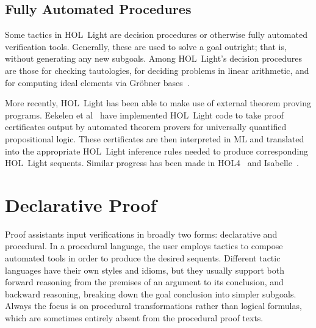 \subsection{Fully Automated Procedures}
Some tactics in HOL~Light are decision procedures or otherwise fully automated verification tools. Generally, these are used to solve a goal outright; that is, without generating any new subgoals. Among HOL~Light's decision procedures are those for checking tautologies, for deciding problems in linear arithmetic, and for computing ideal elements via Gr\"{o}bner bases~\cite{BuchbergerGrobner}.

More recently, HOL~Light has been able to make use of external theorem proving programs. Eekelen et al~\cite{HOLLightBoolean} have implemented HOL~Light code to take proof certificates output by automated theorem provers for universally quantified propositional logic. These certificates are then interpreted in ML and translated into the appropriate HOL~Light inference rules needed to produce corresponding HOL~Light sequents. Similar progress has been made in HOL4~\cite{HOLBoolean} and Isabelle~\cite{IsabelleSledgehammer}.

\section{Declarative Proof}\label{sec:DeclarativeProof}
Proof assistants input verifications in broadly two forms: declarative and procedural. In a procedural language, the user employs tactics to compose automated tools in order to produce the desired sequents. Different tactic languages have their own styles and idioms, but they usually support both forward reasoning from the premises of an argument to its conclusion, and backward reasoning, breaking down the goal conclusion into simpler subgoals. Always the focus is on procedural transformations rather than logical formulas, which are sometimes entirely absent from the procedural proof texts. 




